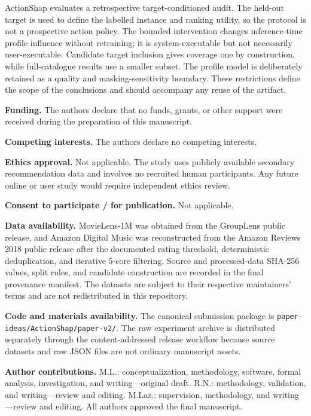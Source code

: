 \documentclass[pdflatex,sn-basic,Numbered]{sn-jnl}
\begin{document}
\begin{appendices}
ActionShap evaluates a retrospective target-conditioned audit. The held-out target is used to define the labelled instance and ranking utility, so the protocol is not a prospective action policy. The bounded intervention changes inference-time profile influence without retraining; it is system-executable but not necessarily user-executable. Candidate target inclusion gives coverage one by construction, while full-catalogue results use a smaller subset. The profile model is deliberately retained as a quality and masking-sensitivity boundary. These restrictions define the scope of the conclusions and should accompany any reuse of the artifact.

\end{appendices}

\textbf{Funding.} The authors declare that no funds, grants, or other support were received during the preparation of this manuscript.

\textbf{Competing interests.} The authors declare no competing interests.

\textbf{Ethics approval.} Not applicable. The study uses publicly available secondary recommendation data and involves no recruited human participants. Any future online or user study would require independent ethics review.

\textbf{Consent to participate / for publication.} Not applicable.

\textbf{Data availability.} MovieLens-1M was obtained from the GroupLens public release, and Amazon Digital Music was reconstructed from the Amazon Reviews 2018 public release after the documented rating threshold, deterministic deduplication, and iterative 5-core filtering. Source and processed-data SHA-256 values, split rules, and candidate construction are recorded in the final provenance manifest. The datasets are subject to their respective maintainers' terms and are not redistributed in this repository.

\textbf{Code and materials availability.} The canonical submission package is \texttt{paper-ideas/ActionShap/paper-v2/}. The raw experiment archive is distributed separately through the content-addressed release workflow because source datasets and raw JSON files are not ordinary manuscript assets.

\textbf{Author contributions.} M.L.: conceptualization, methodology, software, formal analysis, investigation, and writing---original draft. R.N.: methodology, validation, and writing---review and editing. M.Laz.: supervision, methodology, and writing---review and editing. All authors approved the final manuscript.



\end{document}
